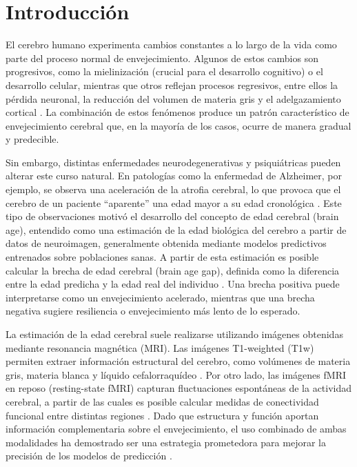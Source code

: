 \chapter{Introducción}
\label{chapter:intro}

El cerebro humano experimenta cambios constantes a lo largo de la vida como parte del proceso normal de envejecimiento. Algunos de estos cambios son progresivos, como la mielinización (crucial para el desarrollo cognitivo) o el desarrollo celular, mientras que otros reflejan procesos regresivos, entre ellos la pérdida neuronal, la reducción del volumen de materia gris y el adelgazamiento cortical \cite{good2001voxel, fjell2010structural, raz2005regional}. La combinación de estos fenómenos produce un patrón característico de envejecimiento cerebral que, en la mayoría de los casos, ocurre de manera gradual y predecible.

Sin embargo, distintas enfermedades neurodegenerativas y psiquiátricas pueden alterar este curso natural. En patologías como la enfermedad de Alzheimer, por ejemplo, se observa una aceleración de la atrofia cerebral, lo que provoca que el cerebro de un paciente “aparente” una edad mayor a su edad cronológica \cite{franke2010estimating}. Este tipo de observaciones motivó el desarrollo del concepto de edad cerebral (brain age), entendido como una estimación de la edad biológica del cerebro a partir de datos de neuroimagen, generalmente obtenida mediante modelos predictivos entrenados sobre poblaciones sanas. A partir de esta estimación es posible calcular la brecha de edad cerebral (brain age gap), definida como la diferencia entre la edad predicha y la edad real del individuo \cite{smith2019estimation}. Una brecha positiva puede interpretarse como un envejecimiento acelerado, mientras que una brecha negativa sugiere resiliencia o envejecimiento más lento de lo esperado.


La estimación de la edad cerebral suele realizarse utilizando imágenes obtenidas mediante resonancia magnética (MRI). Las imágenes T1-weighted (T1w) permiten extraer información estructural del cerebro, como volúmenes de materia gris, materia blanca y líquido cefalorraquídeo \cite{franke2010estimating}. Por otro lado, las imágenes fMRI en reposo (resting-state fMRI) capturan fluctuaciones espontáneas de la actividad cerebral, a partir de las cuales es posible calcular medidas de conectividad funcional entre distintas regiones \cite{damoiseaux2006consistent, craddock2012whole}. Dado que estructura y función aportan información complementaria sobre el envejecimiento, el uso combinado de ambas modalidades ha demostrado ser una estrategia prometedora para mejorar la precisión de los modelos de predicción \cite{erus2015imaging, groves2012benefits}.


